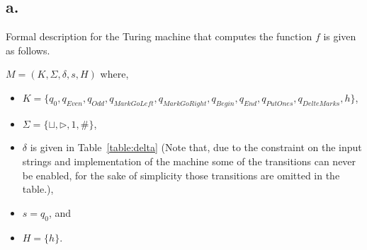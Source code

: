 \documentclass[12pt]{article}
\begin{document}
\subsection*{a.}
Formal description for the Turing machine that computes the function $f$ is given as follows.

$M = (K, \Sigma, \delta, s, H)$ where,
\begin{itemize}
	\item $K = \{q_0, q_{Even}, q_{Odd}, q_{MarkGoLeft}, q_{MarkGoRight}, q_{Begin}, q_{End}, q_{PutOnes}, q_{DelteMarks}, h\}$,
	\item $\Sigma = \{\sqcup, \triangleright, 1, \#\}$,
	\item $\delta$ is given in Table~\ref{table:delta} (Note that, due to the constraint on the input strings and implementation of the machine some of the transitions can never be enabled, for the sake of simplicity those transitions are omitted in the table.),
	\item $s = q_0$, and
	\item $H = \{h\}$.
\end{itemize}
\end{document}
